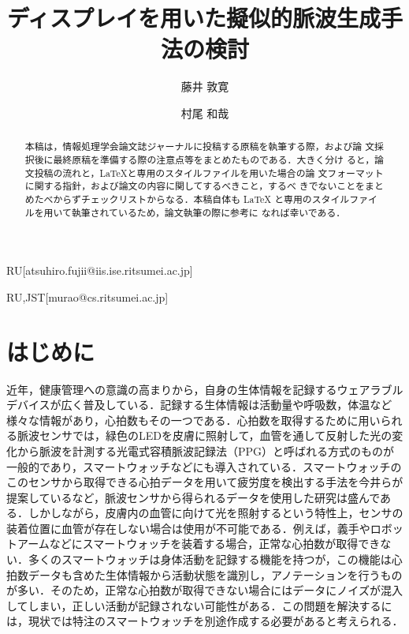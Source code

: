 \documentclass[submit,techrep]{ipsj}
\begin{document}
\title{ディスプレイを用いた擬似的脈波生成手法の検討}


\author{藤井 敦寛}{}{RU}[atsuhiro.fujii@iis.ise.ritsumei.ac.jp]
\author{村尾 和哉}{}{RU,JST}[murao@cs.ritsumei.ac.jp]

\begin{abstract}
	本稿は，情報処理学会論文誌ジャーナルに投稿する原稿を執筆する際，および論
	文採択後に最終原稿を準備する際の注意点等をまとめたものである．大きく分け
	ると，論文投稿の流れと，\LaTeX と専用のスタイルファイルを用いた場合の論
	文フォーマットに関する指針，および論文の内容に関してするべきこと，するべ
	きでないことをまとめたべからずチェックリストからなる．本稿自体も \LaTeX
	と専用のスタイルファイルを用いて執筆されているため，論文執筆の際に参考に
	なれば幸いである．
\end{abstract}

\maketitle





\section{はじめに}
\label{introduction}
近年，健康管理への意識の高まりから，自身の生体情報を記録するウェアラブルデバイスが広く普及している．記録する生体情報は活動量や呼吸数，体温など様々な情報があり，心拍数もその一つである．心拍数を取得するために用いられる脈波センサでは，緑色のLEDを皮膚に照射して，血管を通して反射した光の変化から脈波を計測する光電式容積脈波記録法（PPG）と呼ばれる方式のものが一般的であり，スマートウォッチなどにも導入されている．スマートウォッチのこのセンサから取得できる心拍データを用いて疲労度を検出する手法を今井ら\cite{fatigue_detection}が提案しているなど，脈波センサから得られるデータを使用した研究は盛んである．しかしながら，皮膚内の血管に向けて光を照射するという特性上，センサの装着位置に血管が存在しない場合は使用が不可能である．例えば，義手やロボットアームなどにスマートウォッチを装着する場合，正常な心拍数が取得できない．多くのスマートウォッチは身体活動を記録する機能を持つが，この機能は心拍数データも含めた生体情報から活動状態を識別し，アノテーションを行うものが多い．そのため，正常な心拍数が取得できない場合にはデータにノイズが混入してしまい，正しい活動が記録されない可能性がある．この問題を解決するには，現状では特注のスマートウォッチを別途作成する必要があると考えられる．
\par
\end{document}
